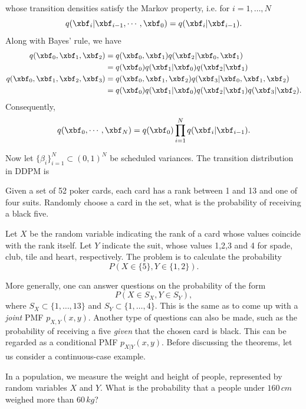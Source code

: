 whose transition densities
satisfy the Markov property, i.e. for $i=1,\ldots,N$
\begin{equation}
  q(\xbf_i|\xbf_{i-1},\cdots,\xbf_0)=q(\xbf_i|\xbf_{i-1}).
\end{equation}
Along with Bayes' rule, we have
\begin{align*}
  q(\xbf_0,\xbf_1,\xbf_2)
   & = q(\xbf_0,\xbf_1)q(\xbf_2|\xbf_0,\xbf_1)                   \\
   & =q(\xbf_0)q(\xbf_1|\xbf_0)q(\xbf_2|\xbf_1)                  \\
  q(\xbf_0,\xbf_1,\xbf_2,\xbf_3)
   & = q(\xbf_0,\xbf_1,\xbf_2)q(\xbf_3|\xbf_0,\xbf_1,\xbf_2)     \\
   & =q(\xbf_0)q(\xbf_1|\xbf_0)q(\xbf_2|\xbf_1)q(\xbf_3|\xbf_2).
\end{align*}
Consequently,
\begin{equation} q(\xbf_0,\cdots,\xbf_N)=q(\xbf_0)\prod\limits_{i=1}^Nq(\xbf_i|\xbf_{i-1}).
\end{equation}

Now let $\{\beta_i\}_{i=1}^N\subset(0,1)^N$ be scheduled variances. The transition distribution in DDPM is

\begin{example}
  Given a set of 52 poker cards, each card has a rank between 1 and 13 and one of four suits. Randomly choose a card in the set, what is the probability of receiving a black five.
\end{example}

Let $X$ be the random variable indicating the rank of a card whose values coincide with the rank itself. Let $Y$ indicate the suit, whose values 1,2,3 and 4 for spade, club, tile and heart, respectively. The problem is to calculate the probability
$$P(X\in\{5\}, Y\in\{1,2\}).$$

More generally, one can answer questions on the probability of the form
$$P(X\in S_X, Y\in S_Y),$$
where $S_X\subset\{1,\ldots,13\}$ and $S_Y\subset\{1,\ldots,4\}$. This is the same as to come up with a \textit{joint} PMF $p_{X,Y}(x,y)$. Another type of questions can also be made, such as the probability of receiving a five \textit{given} that the chosen card is black. This can be regarded as a conditional PMF $p_{X|Y}(x,y)$. Before discussing the theorems, let us consider a continuous-case example.

\begin{example}
  In a population, we measure the weight and height of people, represented by random variables $X$ and $Y$. What is the probability that a people under $160\,cm$ weighed more than $60\,kg$?
\end{example}

